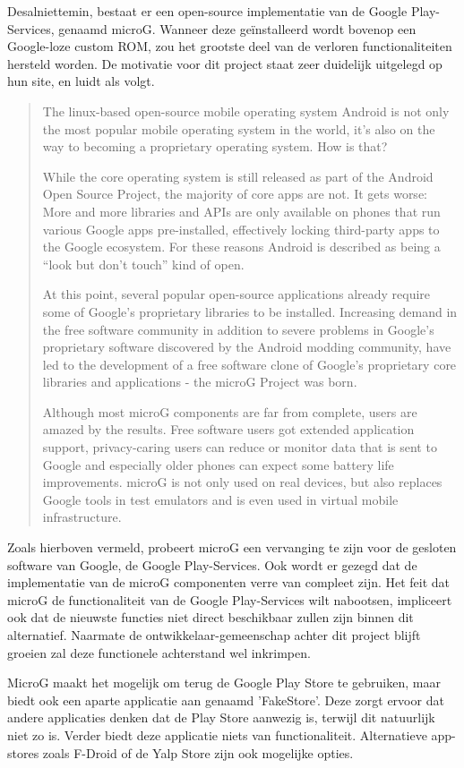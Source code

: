 Desalniettemin, bestaat er een open-source implementatie van de Google Play-Services, genaamd microG. Wanneer deze geïnstalleerd wordt bovenop een Google-loze custom ROM, zou het grootste deel van de verloren functionaliteiten hersteld worden. De motivatie voor dit project staat zeer duidelijk uitgelegd op hun site, en luidt als volgt. \blockcquote{microg}{
    The linux-based open-source mobile operating system Android is not only the most popular mobile operating system in the world, it’s also on the way to becoming a proprietary operating system. How is that?
    
    While the core operating system is still released as part of the Android Open Source Project, the majority of core apps are not. It gets worse: More and more libraries and APIs are only available on phones that run various Google apps pre-installed, effectively locking third-party apps to the Google ecosystem. For these reasons Android is described as being a “look but don’t touch” kind of open.
    
    At this point, several popular open-source applications already require some of Google’s proprietary libraries to be installed. Increasing demand in the free software community in addition to severe problems in Google’s proprietary software discovered by the Android modding community, have led to the development of a free software clone of Google’s proprietary core libraries and applications - the microG Project was born.
    
    Although most microG components are far from complete, users are amazed by the results. Free software users got extended application support, privacy-caring users can reduce or monitor data that is sent to Google and especially older phones can expect some battery life improvements. microG is not only used on real devices, but also replaces Google tools in test emulators and is even used in virtual mobile infrastructure.
}
Zoals hierboven vermeld, probeert microG een vervanging te zijn voor de gesloten software van Google, de Google Play-Services. Ook wordt er gezegd dat de implementatie van de microG componenten verre van compleet zijn. Het feit dat microG de functionaliteit van de Google Play-Services wilt nabootsen, impliceert ook dat de nieuwste functies niet direct beschikbaar zullen zijn binnen dit alternatief. Naarmate de ontwikkelaar-gemeenschap achter dit project blijft groeien zal deze functionele achterstand wel inkrimpen.

MicroG maakt het mogelijk om terug de Google Play Store te gebruiken, maar biedt ook een aparte applicatie aan genaamd 'FakeStore'. Deze zorgt ervoor dat andere applicaties denken dat de Play Store aanwezig is, terwijl dit natuurlijk niet zo is. Verder biedt deze applicatie niets van functionaliteit. Alternatieve app-stores zoals F-Droid of de Yalp Store zijn ook mogelijke opties. \autocite{shadow53_play-store}

